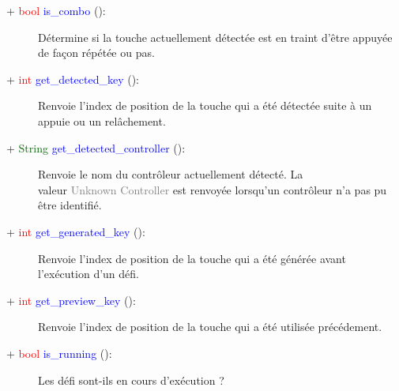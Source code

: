\documentclass[a4paper, 11pt]{article}
\begin{document}
	\begin{description}
		\item [+ \textcolor{red}{bool} \textcolor{blue}{is\_combo} ():] Détermine si la touche actuellement 
		détectée est en traint d'être appuyée de façon répétée ou pas.\\
	\end{description}
	\begin{description}
		\item [+ \textcolor{red}{int} \textcolor{blue}{get\_detected\_key} ():] Renvoie l'index de position
		de la touche qui a été détectée suite à un appuie ou un relâchement.\\
	\end{description}
	\begin{description}
		\item [+ \textcolor{darkgreen}{String} \textcolor{blue}{get\_detected\_controller} ():] Renvoie le 
		nom du contrôleur actuellement détecté. La \\valeur \textcolor{gray}{Unknown Controller} est
		renvoyée lorsqu'un contrôleur n'a pas pu être identifié.\\
	\end{description}
	\begin{description}
		\item [+ \textcolor{red}{int} \textcolor{blue}{get\_generated\_key} ():] Renvoie l'index de position
		de la touche qui a été générée avant \\l'exécution d'un défi.\\
	\end{description}
	\begin{description}
		\item [+ \textcolor{red}{int} \textcolor{blue}{get\_preview\_key} ():] Renvoie l'index de position
		de la touche qui a été utilisée précédement.\\
	\end{description}
	\begin{description}
		\item [+ \textcolor{red}{bool} \textcolor{blue}{is\_running} ():] Les défi sont-ils en cours 
		d'exécution ?\\
	\end{description}
\end{document}
